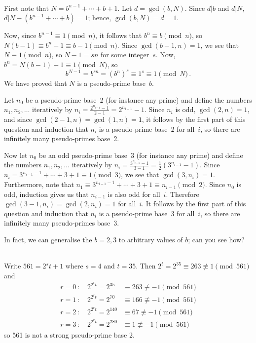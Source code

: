\documentclass[11pt]{article}
\begin{document}
\bigskip{}\\
First note that $N = b^{n-1} + \cdots + b + 1$.
Let $d = \gcd(b,N)$.
Since $d|b$ and $d|N$, $d|N-(b^{n-1} + \cdots + b) = 1$;
hence, $\gcd(b,N) = d = 1$.

Now, since $b^{n-1}\equiv 1\pmod{n}$, 
it follows that $b^n\equiv b\pmod{n}$, 
so $N(b-1)\equiv b^n-1 \equiv b-1\pmod{n}$.
Since $\gcd(b-1,n) = 1$, we see that $N\equiv 1\pmod{n}$, 
so $N-1 = sn$ for some integer~$s$.
Now, $b^n = N(b-1) + 1\equiv 1\pmod{N}$, 
so 
\[
  b^{N-1} = b^{sn} = (b^n)^s\equiv 1^s \equiv 1\pmod{N}\,.
\]
We have proved that $N$ is a pseudo-prime base~$b$.

Let $n_0$ be a pseudo-prime base~2 (for instance any prime)
and define the numbers $n_1,n_2,\ldots$ iteratively by $n_i = \frac{2^{n_{i-1}}-1}{2-1} = 2^{n_{i-1}}-1$.
Since $n_i$ is odd, $\gcd(2,n) = 1$, and since $\gcd(2-1,n) = \gcd(1,n) = 1$,
it follows by the first part of this question and induction
that $n_i$ is a pseudo-prime base~2 for all~$i$, so there are infinitely many pseudo-primes base~2.

Now let $n_0$ be an odd pseudo-prime base~3 (for instance any prime)
and define the numbers $n_1,n_2,\ldots$ iteratively by $n_i = \frac{3^{n_{i-1}}-1}{3-1} = \frac{1}{2}(3^{n_{i-1}}-1)$.
Since $n_i = 3^{n_{i-1}-1} + \cdots + 3 + 1 \equiv 1\pmod{3}$,
we see that $\gcd(3,n_i) = 1$.
Furthermore, note that $n_1 \equiv 3^{n_{i-1}-1} + \cdots + 3 + 1 \equiv n_{i-1}\pmod{2}$.
Since $n_0$ is odd, induction gives us that $n_{i-1}$ is also odd for all~$i$.
Therefore $\gcd(3-1,n_i) = \gcd(2,n_i) = 1$ for all~$i$.
It follows by the first part of this question and induction
that $n_i$ is a pseudo-prime base~3 for all~$i$,
so there are infinitely many pseudo-primes base~3.

In fact, we can generalise the $b=2,3$ to arbitrary values of $b$; can you see how?


\bigskip{}\\
Write $561 = 2^s t + 1$ where $s = 4$ and $t = 35$.
Then $2^t = 2^{35} \equiv 263 \not\equiv 1 \pmod{561}$
and
\begin{align*}
  r = 0\,:\quad 2^{2^rt} = 2^{ 35}&\equiv 263 \not\equiv -1\pmod{561}\\
  r = 1\,:\quad 2^{2^rt} = 2^{ 70}&\equiv 166 \not\equiv -1\pmod{561}\\
  r = 2\,:\quad 2^{2^rt} = 2^{140}&\equiv  67 \not\equiv -1\pmod{561}\\
  r = 3\,:\quad 2^{2^rt} = 2^{280}&\equiv   1 \not\equiv -1\pmod{561}
\end{align*}
so 561 is not a strong pseudo-prime base 2.
\end{document}
